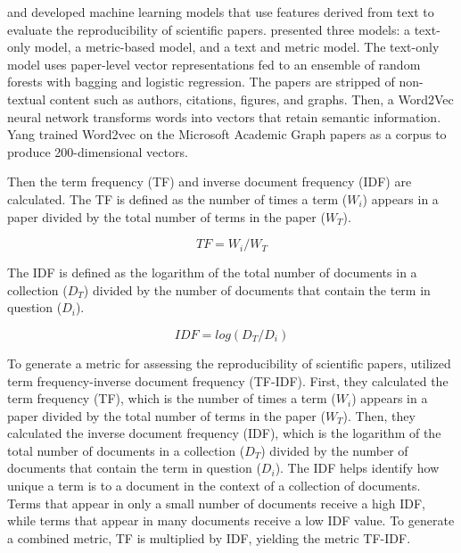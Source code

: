 \documentclass[12pt, a4paper, twocolumn]{article}
\begin{document}
			 \citet{Yang2020estimating} and \citet{luo2020research} developed machine learning models that use features derived from text to evaluate the reproducibility of scientific papers. \citet{Yang2020estimating} presented three models: a text-only model, a metric-based model, and a text and metric model. The text-only model uses paper-level vector representations fed to an ensemble of random forests with bagging and logistic regression. The papers are stripped of non-textual content such as authors, citations, figures, and graphs. Then, a Word2Vec neural network transforms words into vectors that retain semantic information. Yang trained Word2vec on the Microsoft Academic Graph papers as a corpus to produce 200-dimensional vectors.
			
			Then the term frequency (TF) and inverse document frequency (IDF) are calculated. The TF is defined as the number of times a term ($W_{i}$) appears in a paper divided by the total number of terms in the paper ($W_{T}$).

			\begin{equation}  
				TF = W_{i}/W_{T}              
			\end{equation}			

			\noindent The IDF is defined as the logarithm of the total number of documents in a collection ($D_{T}$) divided by the number of documents that contain the term in question ($D_{i}$).  

			\begin{equation}
				IDF = log(D_{T}/D_{i})
			\end{equation}
			
			\noindent To generate a metric for assessing the reproducibility of scientific papers, \citet{Yang2020estimating} utilized term frequency-inverse document frequency (TF-IDF). First, they calculated the term frequency (TF), which is the number of times a term ($W_{i}$) appears in a paper divided by the total number of terms in the paper ($W_{T}$). Then, they calculated the inverse document frequency (IDF), which is the logarithm of the total number of documents in a collection ($D_{T}$) divided by the number of documents that contain the term in question ($D_{i}$). The IDF helps identify how unique a term is to a document in the context of a collection of documents. Terms that appear in only a small number of documents receive a high IDF, while terms that appear in many documents receive a low IDF value. To generate a combined metric, TF is multiplied by IDF, yielding the metric TF-IDF.
\end{document}
